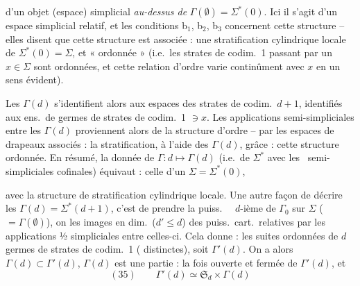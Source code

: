 \documentclass[11pt,a4paper]{article}
\begin{document}

d'un objet (espace) simplicial \emph{au-dessus de} $\Gamma(\emptyset)=\Sigma^{*}(0)$. Ici il s'agit d'un espace simplicial relatif, et les conditions b$_1$, b$_2$, b$_3$ concernent cette structure -- elles disent  que cette structure est associée : une stratification cylindrique locale de $\Sigma^{*}(0)=\Sigma$, et « ordonnée » (i.e.\ les strates de codim.\ 1 passant par un $x\in\Sigma$ sont ordonnées, et cette relation d'ordre varie continûment avec $x$ en un sens évident).

Les  $\Gamma(d)$  s'identifient alors aux  espaces des  strates de codim.\ $d+1$,   identifiés  aux ens.\ de germes de strates de codim.\ 1 \struck{\ill{}} $\ni x$. Les applications semi-simpliciales entre les $\Gamma(d)$ proviennent alors de la structure d'ordre -- \struck{\ill{}} par  les espaces de drapeaux associés : la stratification, à l'aide des \struck{\ill{}} $\Gamma(d)$, grâce : cette structure ordonnée. En résumé, la donnée de $\Gamma : d\mapsto\Gamma(d)$ \struck{\ill{}} (i.e.\ de $\Sigma^{*}$ avec les \ semi-simpliciales cofinales) équivaut : celle d'un $\Sigma=\Sigma^{*}(0)$,


avec la structure de stratification cylindrique  locale.  Une autre façon de décrire les $\Gamma(d)=\Sigma^{*}(d+1)$, c'est de prendre la puiss.\ \  $d$-ième de $\Gamma_0$  \struck{\ill{}} sur $\Sigma$ ($=\Gamma(\emptyset)$),  on  les images  en dim.\ ($d'\le d$) des puiss.\ cart.\ relatives  par les applications ½ simpliciales entre celles-ci. Cela donne :  les \struck{\ill{}} suites ordonnées de $d$ germes de strates de codim.\ 1  (\struck{\ill{}} distinctes), soit $\Gamma'(d)$. On a alors $\Gamma(d)\subset\Gamma'(d)$, $\Gamma(d)$ est une partie : la fois ouverte et fermée de $\Gamma'(d)$, et 
\[
(35)\qquad \Gamma'(d)\simeq\mathfrak{S}_d\times\Gamma(d)
\]
\end{document}
